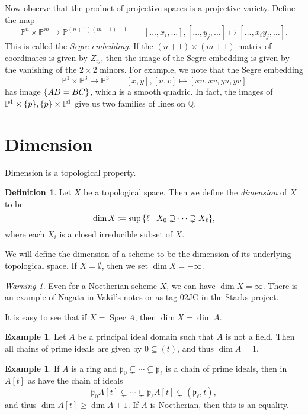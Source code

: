 \documentclass[leqno, openany]{memoir}
\theoremstyle{definition}
\newtheorem{defn}[thm]{Definition}
\newtheorem{exm}[thm]{Example}
\theoremstyle{remark}
\newtheorem{warn}[thm]{Warning}
\theoremstyle{plain}
\theoremstyle{definition}
\theoremstyle{remark}
\newcommand{\Q}{\mathbb{Q}}
\renewcommand{\P}{\mathbb{P}}
\newcommand{\mf}[1]{\mathfrak{#1}}
\DeclareMathOperator{\Spec}{Spec}
\begin{document}
Now observe that the product of projective spaces is a projective variety.
Define the map \[ \P^n \times \P^m \to \P^{(n+1)(m+1)-1} \qquad [\ldots,
x_i,\ldots], [\ldots, y_j, \ldots] \mapsto [\ldots, x_i y_j, \ldots]. \] This
is called the \textit{Segre embedding}. If the $(n+1) \times (m+1)$ matrix of
coordinates is given by $Z_{ij}$, then the image of the Segre embedding is
given by the vanishing of the $2 \times 2$ minors. For example, we note that
the Segre embedding \[ \P^1 \times \P^3 \to \P^3 \qquad [x,y], [u,v] \mapsto
[xu,xv,yu,yv] \] has image $\qty{AD = BC}$, which is a smooth quadric. In fact,
the images of $\P^1 \times \qty{p}, \qty{p} \times \P^1$ give us two families
of lines on $\Q$.

\section{Dimension}%

Dimension is a topological property. 

\begin{defn} Let $X$ be a topological space. Then we define the
    \textit{dimension} of $X$ to be \[ \dim X \coloneqq \sup \qty{\ell \mid X_0
    \supsetneq \cdots \supsetneq X_{\ell}}, \] where each $X_i$ is a closed
    irreducible subset of $X$.  \end{defn}

We will define the dimension of a scheme to be the dimension of its underlying
topological space. If $X = \emptyset$, then we set $\dim X = - \infty$. 

\begin{warn} Even for a Noetherian scheme $X$, we can have $\dim X = \infty$.
There is an example of Nagata in Vakil's notes or as tag
\href{https://stacks.math.columbia.edu/tag/02JC}{02JC} in the Stacks project.
\end{warn}

It is easy to see that if $X = \Spec A$, then $\dim X = \dim A$.

\begin{exm} Let $A$ be a principal ideal domain such that $A$ is not a field.
Then all chains of prime ideals are given by $0 \subseteq (t)$, and thus $\dim
A = 1$.  \end{exm}

\begin{exm} If $A$ is a ring and $\mf{p}_0 \subsetneq \cdots \subsetneq
    \mf{p}_{\ell}$ is a chain of prime ideals, then in $A[t]$ as have the chain
    of ideals \[ \mf{p}_0 A[t] \subsetneq \cdots \subsetneq \mf{p}_{\ell} A[t]
    \subsetneq (\mf{p}_{\ell}, t), \] and thus $\dim A[t] \geq \dim A + 1$. If
$A$ is Noetherian, then this is an equality.  \end{exm}
\end{document}
